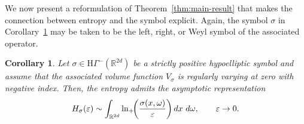 \documentclass[a4paper,12pt]{article}
\newtheorem{corollary}[theorem]{Corollary}%
\let\originalleft\left
\let\originalright\right
\renewcommand{\left}{\mathopen{}\mathclose\bgroup\originalleft}
\renewcommand{\right}{\aftergroup\egroup\originalright}
\newcommand{\R}{\mathbb{R}}
\newcommand{\diff}{\mathop{}\!d}
\newcommand{\hyponegclass}{\mathrm{H}\Gamma^-}
\begin{document}





We now present a reformulation of Theorem~\ref{thm:main-result} that makes the
connection between entropy and the symbol explicit. Again, the
symbol $\sigma$ in Corollary~\ref{cor:ME-Main} may be taken to be the left, right,
or Weyl symbol of the associated operator.

\begin{corollary}\label{cor:ME-Main}
Let $\sigma\in\hyponegclass(\R^{2d})$ be a strictly positive hypoelliptic symbol
and assume that the associated volume function $V_\sigma$ is regularly varying at
zero with negative index. Then, the entropy admits the
asymptotic representation
\begin{equation}\label{eq:main-res-entropy-corr}
    H_{\sigma}(\varepsilon)
    \sim \int_{\R^{2d}} \ln_{+}\!\left(\frac{\sigma(x,\omega)}{\varepsilon}\right)
    \diff x\,\diff\omega,
    \qquad \varepsilon \to 0.
\end{equation}
\end{corollary}
\end{document}
